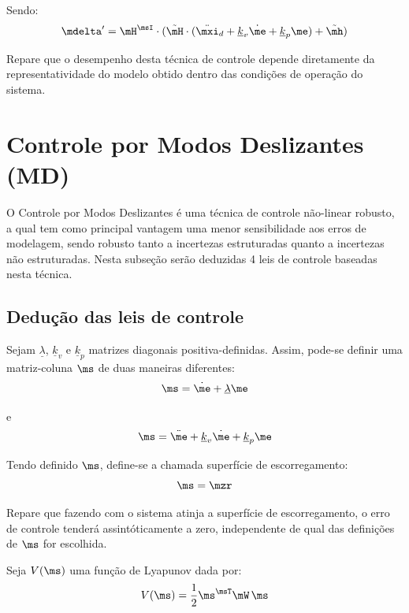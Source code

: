 \documentclass[]{politex}
\begin{document}
Sendo:
\begin{equation}
\mdelta' = \mH^\msI \cdot ( \tilde{\mH} \cdot (\ddot{\mxi}_d + \underline{k}_v \dot{\me} + \underline{k}_p \me ) + \tilde{\mh} )
\end{equation}

Repare que o desempenho desta técnica de controle depende diretamente da representatividade do modelo obtido dentro das condições de operação do sistema. 


\section{Controle por Modos Deslizantes (MD)} \label{sec:CMD}

O Controle por Modos Deslizantes é uma técnica de controle não-linear robusto, a qual tem como principal vantagem uma menor sensibilidade aos erros de modelagem, sendo robusto tanto a incertezas estruturadas quanto a incertezas não estruturadas. Nesta subseção serão deduzidas 4 leis de controle baseadas nesta técnica.

\subsection{Dedução das leis de controle}

Sejam $\underline{\lambda}$, $\underline{k}_v$ e $\underline{k}_p$ matrizes diagonais positiva-definidas. Assim, pode-se definir uma matriz-coluna $\ms$ de duas maneiras diferentes:
\begin{equation} \label{eq:SlidingSurfaces}
\ms = \dot{\me} + \underline{\lambda}\me
\end{equation}

e
\begin{equation} \label{eq:SlidingSurfaces_}
\ms = \ddot{\me} + \underline{k}_v\dot{\me} + \underline{k}_p\me
\end{equation}

Tendo definido $\ms$, define-se a chamada superfície de escorregamento:
\begin{equation} \label{eq:SuperficieDeEscorregamento}
\ms = \mzr
\end{equation}

Repare que fazendo com o sistema atinja a superfície de escorregamento, o erro de controle tenderá assintóticamente a zero, independente de qual das definições de $\ms$ for escolhida.
 
Seja $V(\ms)$ uma função de Lyapunov dada por:
\begin{equation}
V(\ms) = \frac{1}{2} \ms^\msT \mW \, \ms
\end{equation}
\end{document}
